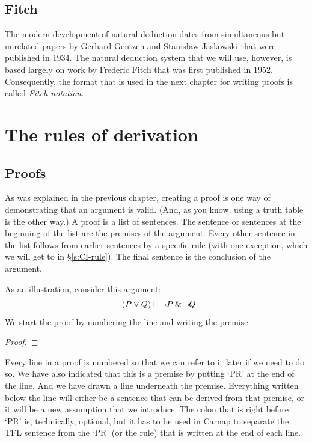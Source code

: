 \section{Fitch} 

The modern development of natural deduction dates from simultaneous but unrelated papers by Gerhard Gentzen and Stanisław Jaskowski that were published in 1934. The natural deduction system that we will use, however, is based largely on work by Frederic Fitch that was first published in 1952. Consequently, the format that is used in the next chapter for writing proofs is called \textit{Fitch notation}.


\chapter{The rules of derivation}\label{s:BasicTFL}

\section{Proofs}\label{intro-proofs}

As was explained in the previous chapter, creating a {proof} is one way of demonstrating that an argument is valid. (And, as you know, using a truth table is the  other way.) A proof is a list of sentences. The sentence or sentences at the beginning of the list are the premises of the argument. Every other sentence in the list follows from earlier sentences by a specific rule (with one exception, which we will get to in \S \ref{s:CI-rule}). The final sentence is the conclusion of the argument.

As an illustration, consider this argument:
	$${\neg} (P \vee Q) \vdash {\neg} P \mathbin{\&} {\neg} Q$$
We start the proof by numbering the line and writing the premise:
\begin{proof}
	 \pr{}
\end{proof}
Every line in a proof is numbered so that we can refer to it later if we need to do so. We have also indicated that this is a premise by putting `PR' at the end of the line. And we have drawn a line underneath the premise. Everything written below the line will either be a sentence that can be derived from that premise, or it will be a new assumption that we introduce. The colon that is right before `PR' is, technically, optional, but it has to be used in Carnap to separate the TFL sentence from the `PR' (or the rule) that is written at the end of each line.

